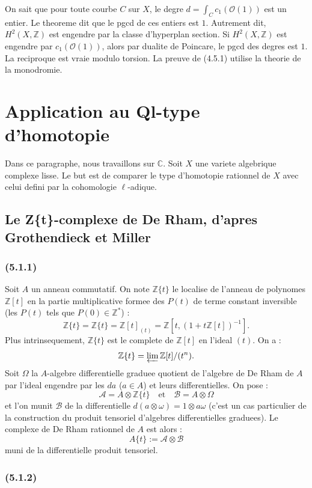 \documentclass[12pt,a4paper]{article}
\theoremstyle{plain}
\theoremstyle{definition}
\theoremstyle{remark}
\newcommand{\bbZ}{\mathbb{Z}}
\newcommand{\bbC}{\mathbb{C}}
\newcommand{\scrO}{\mathscr{O}}
\newcommand{\scrA}{\mathscr{A}}
\newcommand{\scrB}{\mathscr{B}}
\newcommand{\Zt}{\mathbb{Z}\{t\}}
\newcommand{\At}{A\{t\}}
\begin{document}
On sait que pour toute courbe $C$ sur $X$, le degre $d = \int_C c_1(\scrO(1))$ est un entier. Le theoreme dit que le pgcd de ces entiers est $1$. Autrement dit, $H^2(X, \bbZ)$ est engendre par la classe d'hyperplan section. Si $H^2(X, \bbZ)$ est engendre par $c_1(\scrO(1))$, alors par dualite de Poincare, le pgcd des degres est $1$. La reciproque est vraie modulo torsion. La preuve de (4.5.1) utilise la theorie de la monodromie.


\section{Application au Ql-type d'homotopie}

Dans ce paragraphe, nous travaillons sur $\bbC$. Soit $X$ une variete algebrique complexe lisse. Le but est de comparer le type d'homotopie rationnel de $X$ avec celui defini par la cohomologie $\ell$-adique.

\subsection{Le Z\{t\}-complexe de De Rham, d'apres Grothendieck et Miller}

\subsubsection*{\textup{(5.1.1)}}

Soit $A$ un anneau commutatif. On note $\Zt$ le localise de l'anneau de polynomes $\bbZ[t]$ en la partie multiplicative formee des $P(t)$ de terme constant inversible (les $P(t)$ tels que $P(0) \in \bbZ^*$) :
\[
\Zt = \bbZ\{t\} = \bbZ[t]_{(t)} = \bbZ[t, (1+t\bbZ[t])^{-1}].
\]
Plus intrinsequement, $\Zt$ est le complete de $\bbZ[t]$ en l'ideal $(t)$. On a :
\[
\Zt = \varprojlim \bbZ[t]/(t^n).
\]
Soit $\Omega$ la $A$-algebre differentielle graduee quotient de l'algebre de De Rham de $A$ par l'ideal engendre par les $da$ ($a \in A$) et leurs differentielles. On pose :
\[
\scrA = A \otimes \Zt \quad \text{et} \quad \scrB = A \otimes \Omega
\]
et l'on munit $\scrB$ de la differentielle $d(a \otimes \omega) = 1 \otimes a\omega$ (c'est un cas particulier de la construction du produit tensoriel d'algebres differentielles graduees). Le complexe de De Rham rationnel de $A$ est alors :
\[
\At := \scrA \otimes \scrB
\]
muni de la differentielle produit tensoriel.

\subsubsection*{\textup{(5.1.2)}}
\end{document}
